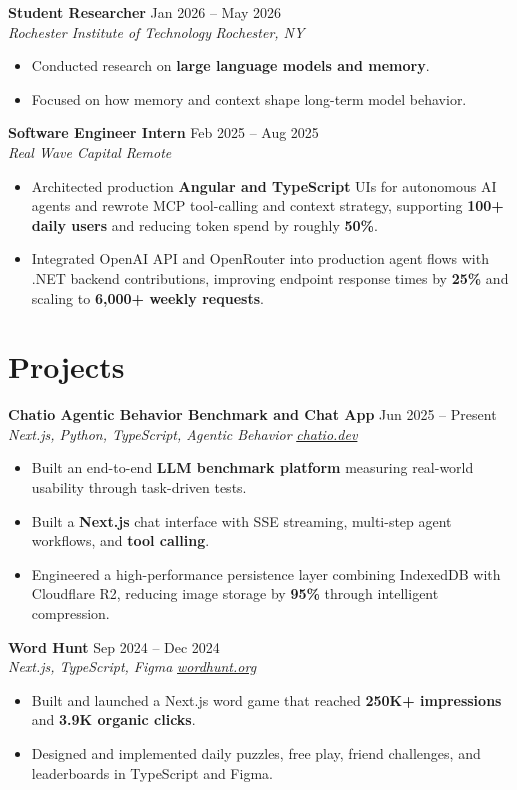 \documentclass[10pt,letterpaper]{article}
\newif\ifresumeFirstRole
\newcommand{\resumeRole}[4]{%
  \ifresumeFirstRole
    \global\resumeFirstRolefalse
  \else
    \vspace{0pt plus 1fill}%
  \fi
  \textbf{#1} \hfill #2\\
  \textit{#3} \hfill \textit{#4}
}
\begin{document}
\resumeRole{Student Researcher}{Jan 2026 -- May 2026}{Rochester Institute of Technology}{Rochester, NY}
\begin{itemize}
  \item Conducted research on \textbf{large language models and memory}.
  \item Focused on how memory and context shape long-term model behavior.
\end{itemize}

\resumeRole{Software Engineer Intern}{Feb 2025 -- Aug 2025}{Real Wave Capital}{Remote}
\begin{itemize}
  \item Architected production \textbf{Angular and TypeScript} UIs for autonomous AI agents and rewrote MCP tool-calling and context strategy, supporting \textbf{100+ daily users} and reducing token spend by roughly \textbf{50\%}.
  \item Integrated OpenAI API and OpenRouter into production agent flows with .NET backend contributions, improving endpoint response times by \textbf{25\%} and scaling to \textbf{6,000+ weekly requests}.
\end{itemize}

\section*{Projects}
\resumeRole{Chatio Agentic Behavior Benchmark and Chat App}{Jun 2025 -- Present}{Next.js, Python, TypeScript, Agentic Behavior}{\href{https://chatio.dev}{chatio.dev}}
\begin{itemize}
  \item Built an end-to-end \textbf{LLM benchmark platform} measuring real-world usability through task-driven tests.
  \item Built a \textbf{Next.js} chat interface with SSE streaming, multi-step agent workflows, and \textbf{tool calling}.
  \item Engineered a high-performance persistence layer combining IndexedDB with Cloudflare R2, reducing image storage by \textbf{95\%} through intelligent compression.
\end{itemize}

\resumeRole{Word Hunt}{Sep 2024 -- Dec 2024}{Next.js, TypeScript, Figma}{\href{https://wordhunt.org}{wordhunt.org}}
\begin{itemize}
  \item Built and launched a Next.js word game that reached \textbf{250K+ impressions} and \textbf{3.9K organic clicks}.
  \item Designed and implemented daily puzzles, free play, friend challenges, and leaderboards in TypeScript and Figma.
\end{itemize}
\end{document}
